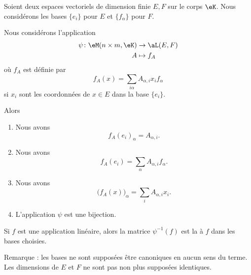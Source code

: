 \begin{propositionDef}      \label{PROPooGXDBooHfKRrv}
	Soient deux espaces vectoriels de dimension finie \( E,F\) sur le corps \( \eK\). Nous considérons les bases \( \{ e_i \}\) pour \( E\) et \( \{ f_{\alpha} \}\) pour \( F\).

	Nous considérons l'application
	\begin{equation}
		\begin{aligned}
			\psi\colon \eM(n\times m, \eK) & \to \aL(E,F) \\
			A                              & \mapsto f_A
		\end{aligned}
	\end{equation}
	où \( f_A\) est définie par
	\begin{equation}        \label{EQooZKEKooNYjvhP}
		f_A(x)=\sum_{i\alpha}A_{\alpha, i}x_if_{\alpha}
	\end{equation}
	si \( x_i\) sont les coordonnées de \( x\in E\) dans la base \( \{ e_i \}\).

	Alors
	\begin{enumerate}
		\item       \label{ITEMooKZYYooZPTkpq}
		      Nous avons
		      \begin{equation}
			      f_A(e_i)_{\alpha}=A_{\alpha, i}.
		      \end{equation}
		\item       \label{ITEMooANXFooGIuxUR}
		      Nous avons
		      \begin{equation}          \label{EQooOKOJooYgteNP}
			      f_A(e_i)=\sum_{\alpha}A_{\alpha, i}f_{\alpha}.
		      \end{equation}
		\item       \label{ITEMooXLLLooKfigfB}
		      Nous avons
		      \begin{equation}          \label{EQooAXRJooUwHbjB}
			      \big( f_A(x) \big)_{\alpha}=\sum_{i}A_{\alpha, i}x_i.
		      \end{equation}
		\item       \label{ITEMooHSMLooRJZref}
		      L'application \( \psi\) est une bijection.
	\end{enumerate}
	Si \( f\) est une application linéaire, alors la matrice \( \psi^{-1}(f)\) est la  à \( f\) dans les bases choisies.
\end{propositionDef}

Remarque : les bases ne sont supposées être canoniques en aucun sens du terme. Les dimensions de \( E\) et \( F\) ne sont pas non plus supposées identiques.

